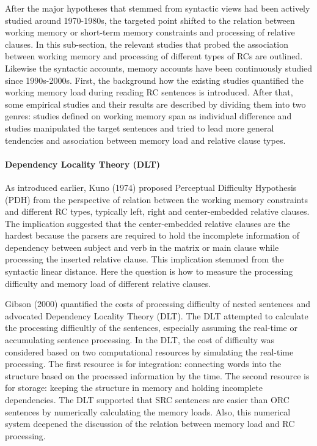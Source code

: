\documentclass[
]{article}
\begin{document}
After the major hypotheses that stemmed from syntactic views had been
actively studied around 1970-1980s, the targeted point shifted to the
relation between working memory or short-term memory constraints and
processing of relative clauses. In this sub-section, the relevant
studies that probed the association between working memory and
processing of different types of RCs are outlined. Likewise the
syntactic accounts, memory accounts have been continuously studied since
1990s-2000s. First, the background how the existing studies quantified
the working memory load during reading RC sentences is introduced. After
that, some empirical studies and their results are described by dividing
them into two genres: studies defined on working memory span as
individual difference and studies manipulated the target sentences and
tried to lead more general tendencies and association between memory
load and relative clause types.

\paragraph{Dependency Locality Theory
(DLT)}\label{dependency-locality-theory-dlt}

As introduced earlier, Kuno (1974) proposed Perceptual Difficulty
Hypothesis (PDH) from the perspective of relation between the working
memory constraints and different RC types, typically left, right and
center-embedded relative clauses. The implication suggested that the
center-embedded relative clauses are the hardest because the parsers are
required to hold the incomplete information of dependency between
subject and verb in the matrix or main clause while processing the
inserted relative clause. This implication stemmed from the syntactic
linear distance. Here the question is how to measure the processing
difficulty and memory load of different relative clauses.

Gibson (2000) quantified the costs of processing difficulty of nested
sentences and advocated Dependency Locality Theory (DLT). The DLT
attempted to calculate the processing difficultly of the sentences,
especially assuming the real-time or accumulating sentence processing.
In the DLT, the cost of difficulty was considered based on two
computational resources by simulating the real-time processing. The
first resource is for integration: connecting words into the structure
based on the processed information by the time. The second resource is
for storage: keeping the structure in memory and holding incomplete
dependencies. The DLT supported that SRC sentences are easier than ORC
sentences by numerically calculating the memory loads. Also, this
numerical system deepened the discussion of the relation between memory
load and RC processing.
\end{document}
